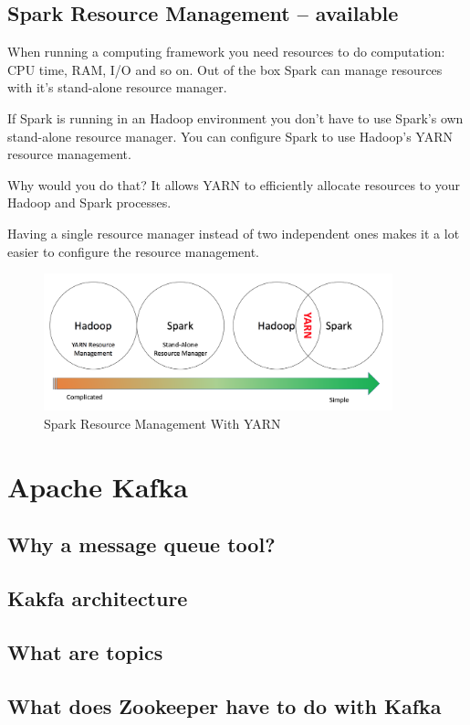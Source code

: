 \documentclass[12pt, numbers=noenddot]{scrreprt} %
\begin{document}
\section{Spark Resource Management -- available}
When running a computing framework you need resources to do computation: CPU time, RAM, I/O and so on. Out of the box Spark can manage resources with it’s stand-alone resource manager.

If Spark is running in an Hadoop environment you don’t have to use Spark’s own stand-alone resource manager. You can configure Spark to use Hadoop’s YARN resource management.

Why would you do that?
It allows YARN to efficiently allocate resources to your Hadoop and Spark processes.

Having a single resource manager instead of two independent ones makes it a lot easier to configure the resource management.

\begin{figure}[htbp]
  \centering
     \includegraphics[width=0.9\textwidth]{images/Spark-Yarn}
  \caption{Spark Resource Management With YARN}
  \label{fig:Bild1}
\end{figure}


\chapter{Apache Kafka}

\section{Why a message queue tool?}
\section{Kakfa architecture}
\section{What are topics}
\section{What does Zookeeper have to do with Kafka}
\end{document}
